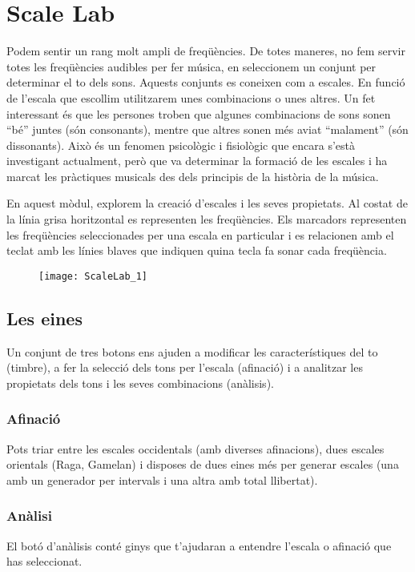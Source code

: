 \section{Scale Lab}
Podem sentir un  rang molt ampli de freqüències. De totes maneres, no fem servir totes les freqüències audibles per fer música, en seleccionem un conjunt per determinar el to dels sons. Aquests conjunts es coneixen com a escales. En funció de l'escala que escollim utilitzarem unes combinacions o unes altres. Un fet interessant és que les persones troben que algunes combinacions de sons sonen  ``bé'' juntes (són consonants), mentre que altres sonen més aviat ``malament'' (són dissonants). Això és un fenomen psicològic i fisiològic que encara s'està investigant actualment, però que va determinar la formació de les escales i ha marcat les pràctiques musicals des dels principis de la història de la música. 

En aquest mòdul, explorem la creació d'escales i les seves propietats. Al costat de la línia grisa horitzontal es representen les freqüències. Els marcadors representen les freqüències seleccionades per una escala en particular i es relacionen amb el teclat amb les línies blaves que indiquen quina tecla fa sonar cada freqüència. 

\begin{figure}[h]
\centering
\texttt{[image: ScaleLab\_1]}
\end{figure}

\subsection{Les eines}
Un conjunt de tres botons ens ajuden a modificar les característiques del to (timbre), a fer la selecció dels tons per l'escala (afinació) i a analitzar les propietats dels tons i les seves combinacions (anàlisis).


\subsubsection{Afinació}
Pots triar entre les escales occidentals (amb diverses afinacions), dues escales orientals (Raga, Gamelan) i disposes de dues eines més per generar escales (una amb un generador per intervals i una altra amb total llibertat).

\subsubsection{Anàlisi}
El botó d'anàlisis conté ginys que t'ajudaran a entendre l'escala o afinació que has seleccionat.

